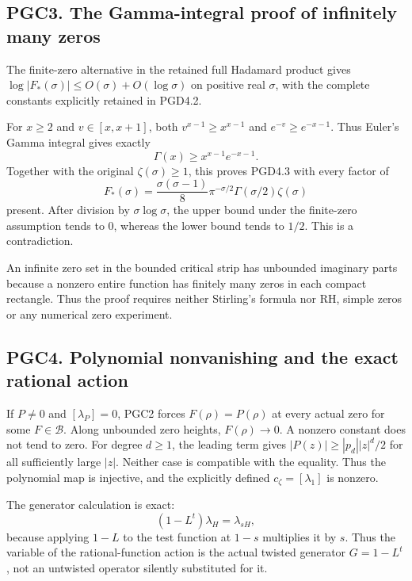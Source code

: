 \subsection{PGC3. The Gamma-integral proof of infinitely many
zeros}\label{pgc3.-the-gamma-integral-proof-of-infinitely-many-zeros}

The finite-zero alternative in the retained full Hadamard product gives
\(\log|F_*(\sigma)|\le O(\sigma)+O(\log\sigma)\) on positive real
\(\sigma\), with the complete constants explicitly retained in PGD4.2.

For \(x\ge2\) and \(v\in[x,x+1]\), both \(v^{x-1}\ge x^{x-1}\) and
\(e^{-v}\ge e^{-x-1}\). Thus Euler's Gamma integral gives exactly \[
 \Gamma(x)\ge x^{x-1}e^{-x-1}.
\] Together with the original \(\zeta(\sigma)\ge1\), this proves PGD4.3
with every factor of \[
 F_*(\sigma)=
 \frac{\sigma(\sigma-1)}8\pi^{-\sigma/2}
 \Gamma(\sigma/2)\zeta(\sigma)
\] present. After division by \(\sigma\log\sigma\), the upper bound
under the finite-zero assumption tends to \(0\), whereas the lower bound
tends to \(1/2\). This is a contradiction.

An infinite zero set in the bounded critical strip has unbounded
imaginary parts because a nonzero entire function has finitely many
zeros in each compact rectangle. Thus the proof requires neither
Stirling's formula nor RH, simple zeros or any numerical zero
experiment.

\subsection{PGC4. Polynomial nonvanishing and the exact rational
action}\label{pgc4.-polynomial-nonvanishing-and-the-exact-rational-action}

If \(P\ne0\) and \([\lambda_P]=0\), PGC2 forces \(F(\rho)=P(\rho)\) at
every actual zero for some \(F\in\mathcal B\). Along unbounded zero
heights, \(F(\rho)\to0\). A nonzero constant does not tend to zero. For
degree \(d\ge1\), the leading term gives \(|P(z)|\ge |p_d||z|^d/2\) for
all sufficiently large \(|z|\). Neither case is compatible with the
equality. Thus the polynomial map is injective, and the explicitly
defined \(c_\zeta=[\lambda_1]\) is nonzero.

The generator calculation is exact: \[
 (1-L^t)\lambda_H=\lambda_{sH},
\] because applying \(1-L\) to the test function at \(1-s\) multiplies
it by \(s\). Thus the variable of the rational-function action is the
actual twisted generator \(G=1-L^t\), not an untwisted operator silently
substituted for it.

